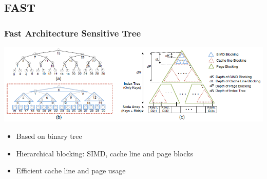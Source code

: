 \documentclass{beamer}
\begin{document}
\subsection{FAST}
\begin{frame}
\frametitle{Fast Architecture Sensitive Tree}
\begin{center}
	\includegraphics[width=1.05\textwidth]{img/fast.png}
\end{center}
\begin{itemize}
	\item Based on binary tree
	\item Hierarchical blocking: SIMD, cache line and page blocks
	\item Efficient cache line and page usage
\end{itemize}
\end{frame}
\end{document}
